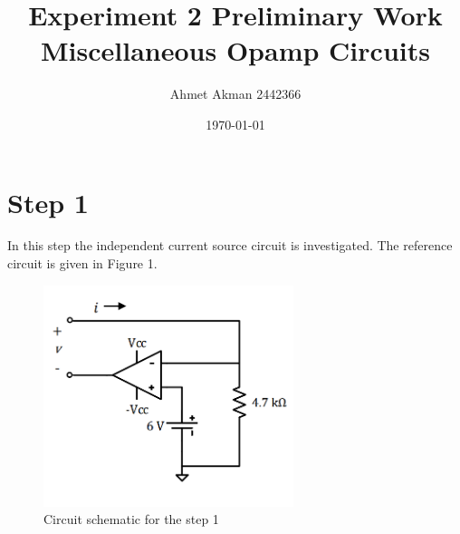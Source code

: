 \documentclass[letterpaper,12pt]{article}
\begin{document}
\title{Experiment 2 Preliminary Work \protect\\ Miscellaneous Opamp Circuits}
\author{Ahmet Akman 2442366 \protect\\}
\date{\today}
\maketitle
\tableofcontents

\section{Step 1}
In this step the independent current source circuit is investigated. The reference circuit is given in Figure 1.
\begin{figure}[H]
    \centering
    \includegraphics[width=0.65\textwidth]{1SCH.png}
\caption{Circuit schematic for the step 1}
\end{figure} 
\end{document}
